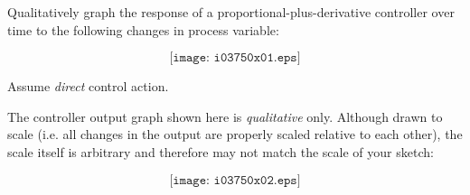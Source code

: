 

Qualitatively graph the response of a proportional-plus-derivative controller over time to the following changes in process variable:

$$\texttt{[image: i03750x01.eps]}$$

Assume {\it direct} control action.
 






The controller output graph shown here is {\it qualitative} only.  Although drawn to scale (i.e. all changes in the output are properly scaled relative to each other), the scale itself is arbitrary and therefore may not match the scale of your sketch:

$$\texttt{[image: i03750x02.eps]}$$











